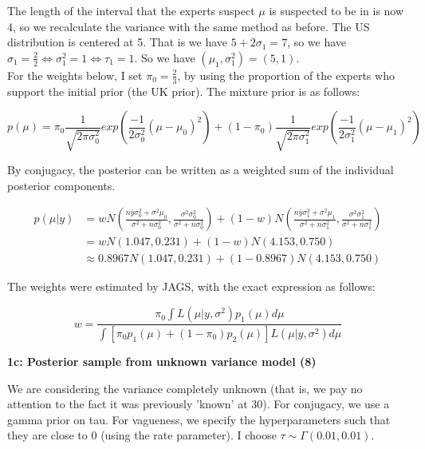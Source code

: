 \documentclass{article}
\begin{document}
The length of the interval that the experts suspect $\mu$ is suspected to be in is now 4, so we recalculate the variance with the same method as before. The US distribution is centered at 5. That is we have $5 + 2\sigma_1 = 7$, so we have $\sigma_1 = \frac{2}{2} \iff \sigma_1^2 = 1 \iff \tau_1 = 1$.  So we have $(\mu_1, \sigma^2_1) = (5, 1)$. \\
For the weights below, I set $\pi_0 = \frac{2}{3}$, by using the proportion of the experts who support the initial prior (the UK prior). The mixture prior is as follows:

\begin{equation}
p(\mu) = \pi_0 \frac{1}{\sqrt{2\pi \sigma^2_0}} exp\left(\frac{-1}{2\sigma^2_0} (\mu - \mu_0)^2 \right) +
(1-\pi_0) \frac{1}{\sqrt{2\pi \sigma^2_1}} exp\left(\frac{-1}{2\sigma^2_1} (\mu - \mu_1)^2 \right)
\end{equation}

By conjugacy, the posterior can be written as a weighted sum of the individual posterior components. 

\begin{align}
p(\mu|y) &= w
N\left(\frac{n\bar{y}\sigma^2_0 + \sigma^2\mu_0}{\sigma^2 + n\sigma^2_0}, \frac{\sigma^2\sigma^2_0}{\sigma^2 + n\sigma^2_0}\right)
 + 
(1-w) N\left(\frac{n\bar{y}\sigma^2_1 + \sigma^2\mu_1}{\sigma^2 + n\sigma^2_1}, \frac{\sigma^2\sigma^2_1}{\sigma^2 + n\sigma^2_1}\right) \label{eq7}\\
&= wN(1.047, 0.231) + (1-w)N(4.153, 0.750)\\
& \approx 0.8967 N(1.047, 0.231) + (1- 0.8967) N(4.153, 0.750)
\label{eq8}
\end{align}

The weights were estimated by JAGS, with the exact expression as follows:

\begin{equation}
w = \frac{\pi_0 \int L(\mu|y, \sigma^2)p_1(\mu)d\mu}{\int [\pi_0 p_1(\mu) + (1-\pi_0)p_2(\mu)]L(\mu|y, \sigma^2)d\mu} \label{eq1b.wexact}
\end{equation}

\textbf{1c: Posterior sample from unknown variance model  (8)} \label{sec:1c}

We are considering the variance completely unknown (that is, we pay no attention to the fact it was previously 'known' at 30). For conjugacy, we use a gamma prior on tau. For vagueness, we specify the hyperparameters such that they are close to 0 (using the rate parameter). I choose $\tau \sim \Gamma(0.01, 0.01)$. 
\end{document}
